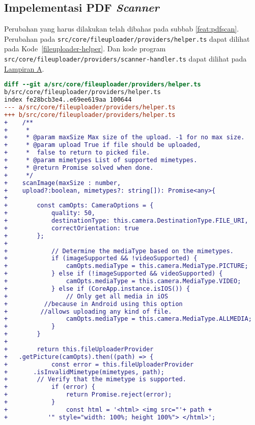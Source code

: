 \subsection{Impelementasi PDF \textit{Scanner}}
Perubahan yang harus dilakukan telah dibahas pada subbab \ref{feat:pdfscan}. Perubahan pada \texttt{src/core/fileuploader/providers/helper.ts} dapat dilihat pada \mbox{Kode \ref{fileuploader-helper}}. Dan kode program \texttt{src/core/fileuploader/providers/scanner-handler.ts} dapat dilihat pada \hyperref[lamp:A]{Lampiran A}.

\begin{lstlisting}[language=diff, frame=single, label ={fileuploader-helper}, caption = Perubahan pada \texttt{src/core/fileuploader/providers/helper.ts} ]
diff --git a/src/core/fileuploader/providers/helper.ts 
b/src/core/fileuploader/providers/helper.ts
index fe28bcb3e4..e69ee619aa 100644
--- a/src/core/fileuploader/providers/helper.ts
+++ b/src/core/fileuploader/providers/helper.ts
+    /**
+     * 
+     * @param maxSize Max size of the upload. -1 for no max size.
+     * @param upload True if file should be uploaded,
+     *  false to return to picked file.
+     * @param mimetypes List of supported mimetypes.  
+     * @return Promise solved when done.
+     */
+    scanImage(maxSize : number,
+    upload?:boolean, mimetypes?: string[]): Promise<any>{
+
+        const camOpts: CameraOptions = {
+            quality: 50,
+            destinationType: this.camera.DestinationType.FILE_URI,
+            correctOrientation: true
+        };
+
+            // Determine the mediaType based on the mimetypes.
+            if (imageSupported && !videoSupported) {
+                camOpts.mediaType = this.camera.MediaType.PICTURE;
+            } else if (!imageSupported && videoSupported) {
+                camOpts.mediaType = this.camera.MediaType.VIDEO;
+            } else if (CoreApp.instance.isIOS()) {
+                // Only get all media in iOS 
+	       //because in Android using this option 
+	      //allows uploading any kind of file.
+                camOpts.mediaType = this.camera.MediaType.ALLMEDIA;
+            }
+        }
+
+        return this.fileUploaderProvider
+	.getPicture(camOpts).then((path) => {
+            const error = this.fileUploaderProvider
+	    .isInvalidMimetype(mimetypes, path); 
+	     // Verify that the mimetype is supported.
+            if (error) {
+                return Promise.reject(error);
+            }
+                const html = '<html> <img src="'+ path +
+	        '" style="width: 100%; height 100%"> </html>';

\end{lstlisting}
